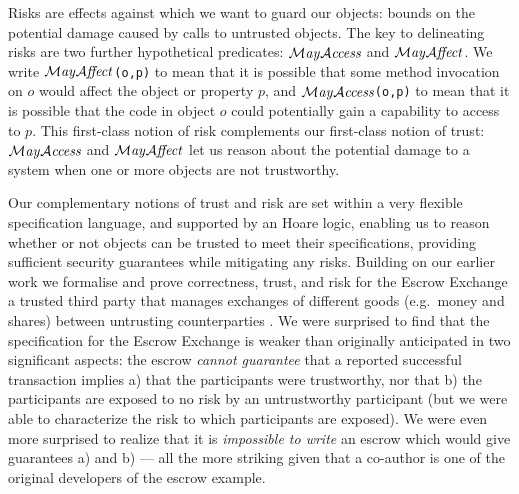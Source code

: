 Risks are effects against which we want to guard our objects: bounds
on the potential damage caused by calls to untrusted objects.  The key
to delineating risks are two further hypothetical predicates:
$\mathcal{M}\textrm{\textit{ay}}{\mathcal{A}}\textrm{\textit{ccess}}$ and $\mathcal{M}\textrm{\textit{ay}}{\mathcal{A}}\textrm{\textit{ffect}}$.  We write
%
\mbox{$\mathcal{M}\textrm{\textit{ay}}{\mathcal{A}}\textrm{\textit{ffect}}$\!\lstinline+(o,p)+}
%
to mean that it is possible that some method invocation on $o$ would
affect the object or property $p$, and
%
\mbox{$\mathcal{M}\textrm{\textit{ay}}{\mathcal{A}}\textrm{\textit{ccess}}$\!\lstinline+(o,p)+}
%
to mean that it is possible that the code in object $o$ could
potentially gain a capability to access to $p$.  This first-class
notion of risk complements our first-class notion of trust:
$\mathcal{M}\textrm{\textit{ay}}{\mathcal{A}}\textrm{\textit{ccess}}$ and $\mathcal{M}\textrm{\textit{ay}}{\mathcal{A}}\textrm{\textit{ffect}}$ let us reason about the
potential damage to a system when one or more objects are not
 trustworthy.

Our complementary notions of trust and risk are set within a very
flexible specification language, and supported by an Hoare logic,
enabling us to reason whether or not objects can be trusted to meet
their specifications, providing sufficient security guarantees while
mitigating any risks.
Building on our earlier work
\cite{capeTalkIFM14,swapsiesOnTheInternet2015} we formalise and prove
correctness, trust, and risk for the Escrow Exchange
\cite{miller-esop2013} a trusted third party that manages exchanges of
different goods (e.g.\ money and shares) between untrusting
counterparties \cite{swapsiesGotGotNeed}.  We were surprised to find
that the specification for the Escrow Exchange is weaker than
originally anticipated in two significant aspects: the escrow {\em
  cannot guarantee} that a reported successful transaction implies a)
that the participants were trustworthy, nor that b) the participants
are exposed to no risk by an untrustworthy participant (but we were
able to characterize the risk to which participants are exposed).  We
were even more surprised to realize that it is {\em impossible to
  write} an escrow which would give guarantees a) and b) ---
%
all the more striking given that a co-author is one of the original
developers of the escrow example.




%

